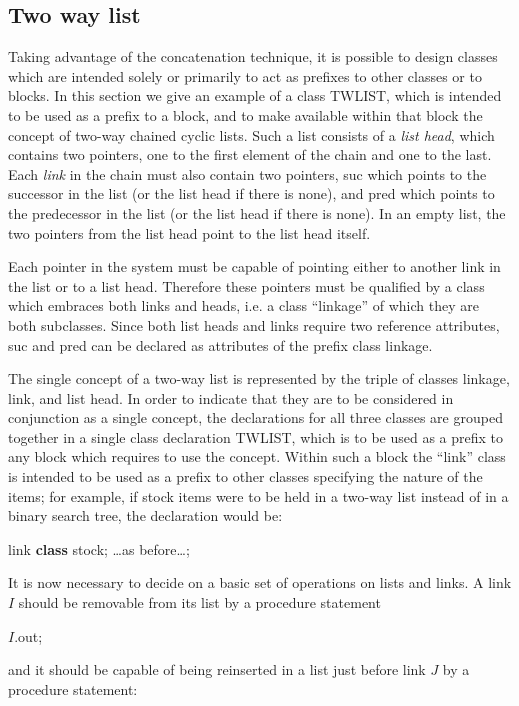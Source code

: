 \subsection{Two way list}

Taking advantage of the concatenation technique, it is possible to design classes which are intended solely or primarily to act as prefixes to other classes or to blocks. In this section we give an example of a class TWLIST, which is intended to be used as a prefix to a block, and to make available within that block the concept of two-way chained cyclic lists. Such a list consists of a \textit{list head}, which contains two pointers, one to the first element of the chain and one to the last. Each \textit{link} in the chain must also contain two pointers, suc which points to the successor in the list (or the list head if there is none), and pred which points to the predecessor in the list (or the list head if there is none). In an empty list, the two pointers from the list head point to the list head itself.

Each pointer in the system must be capable of pointing either to another link in the list or to a list head. Therefore these pointers must be qualified by a class which embraces both links and heads, i.e. a class ``linkage'' of which they are both subclasses. Since both list heads and links require two reference attributes, suc and pred can be declared as attributes of the prefix class linkage.

The single concept of a two-way list is represented by the triple of classes linkage, link, and list head. In order to indicate that they are to be considered in conjunction as a single concept, the declarations for all three classes are grouped together in a single class declaration TWLIST, which is to be used as a prefix to any block which requires to use the concept. Within such a block the ``link'' class is intended to be used as a prefix to other classes specifying the nature of the items; for example, if stock items were to be held in a two-way list instead of in a binary search tree, the declaration would be:

\quad link \textbf{class} stock; \dots as before\dots;

It is now necessary to decide on a basic set of operations on lists and links. A link $I$ should be removable from its list by a procedure statement

\quad $I$.out;

\noindent
and it should be capable of being reinserted in a list just before link $J$ by a procedure statement:

